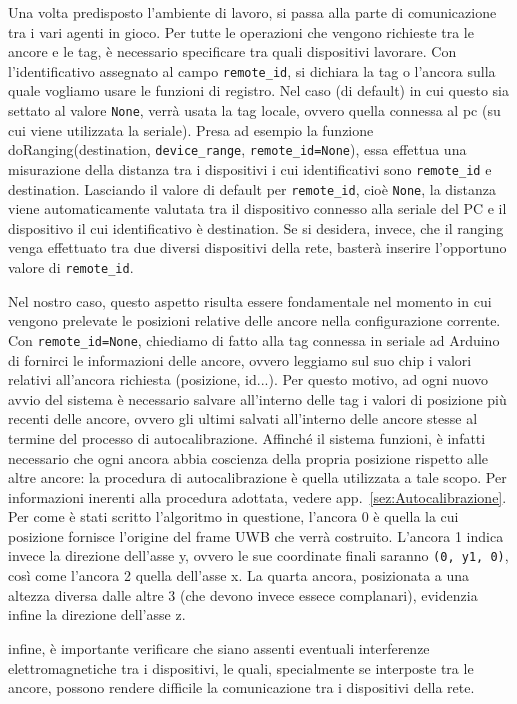 Una volta predisposto l'ambiente di lavoro, si passa alla parte di comunicazione tra i vari agenti in gioco. Per tutte le operazioni che vengono richieste tra le ancore e le tag, è necessario specificare tra quali dispositivi lavorare. 
Con l'identificativo assegnato al campo \verb|remote_id|, si dichiara la tag o l'ancora sulla quale vogliamo usare le funzioni di registro. Nel caso (di default) in cui questo sia settato al valore \verb|None|, verrà usata la tag locale, ovvero quella connessa al pc (su cui viene utilizzata la seriale).
Presa ad esempio la funzione doRanging(destination, \verb|device_range|, \verb|remote_id=None|), essa effettua una misurazione della distanza tra i dispositivi i cui identificativi sono \verb|remote_id| e destination. Lasciando il valore di default per \verb|remote_id|, cioè \verb|None|, la distanza viene automaticamente valutata tra il dispositivo connesso alla seriale del PC e il dispositivo il cui identificativo è destination. 
Se si desidera, invece, che il ranging venga effettuato tra due diversi dispositivi della rete, basterà inserire l’opportuno valore di \verb|remote_id|.

Nel nostro caso, questo aspetto risulta essere fondamentale nel momento in cui vengono prelevate le posizioni relative delle ancore nella configurazione corrente. Con \verb|remote_id=None|, chiediamo di fatto alla tag connessa in seriale ad Arduino di fornirci le informazioni delle ancore, ovvero leggiamo sul suo chip i valori relativi all'ancora richiesta (posizione, id...).
Per questo motivo, ad ogni nuovo avvio del sistema è necessario salvare all'interno delle tag i valori di posizione più recenti delle ancore, ovvero gli ultimi salvati all'interno delle ancore stesse al termine del processo di autocalibrazione.
Affinché il sistema funzioni, è infatti necessario che ogni ancora abbia coscienza della propria posizione rispetto alle altre ancore: la procedura di autocalibrazione è quella utilizzata a tale scopo.
Per informazioni inerenti alla procedura adottata, vedere app.~\ref{sez:Autocalibrazione}. Per come è stati scritto l'algoritmo in questione, l'ancora 0 è quella la cui posizione fornisce l'origine del frame UWB che verrà costruito. 
L'ancora 1 indica invece la direzione dell'asse y, ovvero le sue coordinate finali saranno \verb|(0, y1, 0)|, così come l'ancora 2 quella dell'asse x. La quarta ancora, posizionata a una altezza diversa dalle altre 3 (che devono invece essece complanari), evidenzia infine la direzione dell'asse z.

infine, è importante verificare che siano assenti eventuali interferenze elettromagnetiche tra i dispositivi, le quali, specialmente se interposte tra le ancore, possono rendere difficile la comunicazione tra i dispositivi della rete.

